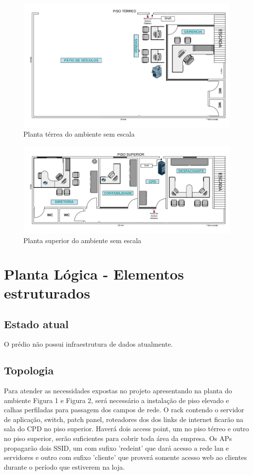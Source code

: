 \documentclass[	DIV=calc,%
							paper=a4,%
							fontsize=12pt,%
							onecolumn]{scrartcl}	 					%
\begin{document}
\begin{figure}[H]
	\centering
	\includegraphics[width=\textwidth]{PlantadoAmbienteTerreo}
	\caption{Planta térrea do ambiente sem escala}
	\label{fig1}
\end{figure}

\begin{figure}[H]
	\centering
	\includegraphics[width=\textwidth]{PlantadoAmbienteSuperior}
	\caption{Planta superior do ambiente sem escala}
	\label{fig2}
\end{figure}

\section{Planta Lógica - Elementos estruturados}

\subsection{Estado atual}
O prédio não possui infraestrutura de dados atualmente.

\subsection{Topologia}
Para atender as necessidades expostas no projeto apresentando na planta do ambiente Figura 1 e Figura 2, será necessário a instalação de piso elevado e calhas perfiladas para passagem dos campos de rede. 
O rack contendo o servidor de aplicação, switch, patch panel, roteadores dos dos links de internet ficarão na sala do CPD no piso superior.
Haverá dois access point, um no piso térreo e outro no piso superior, serão suficientes para cobrir toda área da empresa. Os APs propagarão dois SSID, um
com sufixo 'redeint' que dará acesso a rede lan e servidores e outro com sufixo 'cliente' que proverá somente acesso web ao clientes durante o período que estiverem na loja.
\end{document}
